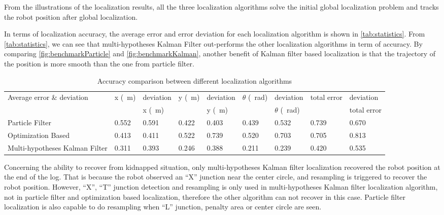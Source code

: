 From the illustrations of the localization results, all the three localization algorithms solve the initial global localization problem and tracks the robot position after global localization. 

In terms of localization accuracy, the average error and error deviation for each localization algorithm is shown in \autoref{tab:statistics}. From \autoref{tab:statistics}, we can see that multi-hypotheses Kalman Filter out-performs the other localization algorithms in term of accuracy. By comparing \autoref{fig:benchmarkParticle} and \autoref{fig:benchmarkKalman}, another benefit of  Kalman filter based localization is that the trajectory of the position is more smooth than the one from particle filter.
\begin{table}[h!]
  \centering
  \caption{Accuracy comparison between different localization algorithms}
  \label{tab:statistics}
  \begin{adjustbox}{max width=\textwidth}
    \begin{tabular}{l|l|l|l|l|l|l|l|l}
      Average error  \& deviation & x (\SI{}{\meter})                   &  deviation     & y  (\SI{}{\meter})                   & deviation        & $\theta$  (\SI{}{\radian})            &deviation    & total error         &deviation           \\
      &                     & x (\SI{}{\meter})&                     &  y (\SI{}{\meter})&                     &  $\theta$ (\SI{}{\radian}) &                     & total error\\ \hline
      Particle Filter                & 0.552& 0.591 & 0.422 & 0.403 & 0.439 & 0.532 & 0.739 & 0.670   \\ \hline
      Optimization Based            & 0.413 & 0.411 & 0.522 & 0.739 & 0.520 & 0.703 & 0.705 & 0.813   \\ \hline
      Multi-hypotheses Kalman Filter & 0.311 & 0.393 & 0.246 & 0.388 & 0.211 & 0.239 & 0.420 & 0.535  
    \end{tabular}
  \end{adjustbox}
\end{table}

Concerning the ability to recover from kidnapped situation, only multi-hypotheses Kalman filter localization recovered the robot position at the end of the log. That is because the robot observed an ``X'' junction near the center circle, and resampling is triggered to recover the robot position. However, ``X'', ``T'' junction detection and resampling is only used in multi-hypotheses Kalman filter localization algorithm, not in particle filter and optimization based localization, therefore the other algorithm can not recover in this case. Particle filter localization is also capable to do resampling when ``L'' junction, penalty area or center circle are seen.

